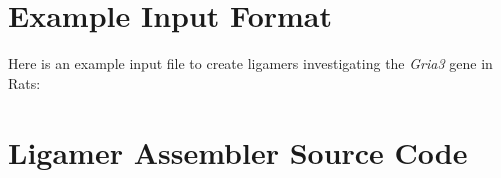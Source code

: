 \section{Example Input Format}
\begin{landscape}
Here is an example input file to create ligamers investigating the \textit{Gria3} gene in Rats:

\begin{table}[!h] %
   \label{Appendix:tab:Example Input Top}
   
   \end{table}

\begin{table}[!h] %
   \label{Appendix:tab:Example Input Bottom}
   
   \end{table}

\end{landscape}
\section{Ligamer Assembler Source Code}\label{apx: Ligamer Assmembler}



